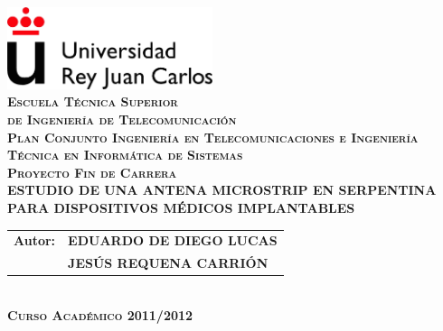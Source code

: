 \begin{titlepage}
    \begin{center}
        \includegraphics[width=6cm]{./Portada/urjc}\\
        \vspace{1.5cm}
        {\LARGE \textsc{ \textbf{ Escuela Técnica Superior }}}\\
        \vspace{0.3cm}
        {\LARGE \textsc{ \textbf{ de Ingeniería de Telecomunicación }}}\\
        \vspace{1.5cm}
        {\Large \textsc{ \textbf{ Plan Conjunto Ingeniería en Telecomunicaciones e Ingeniería Técnica en Informática de Sistemas}}}\\
        \vspace{3.5cm}
        {\huge \textsc{ \textbf{ Proyecto Fin de Carrera }}}\\
        \vspace{3cm}
        {\Large \textbf{ ESTUDIO DE UNA ANTENA MICROSTRIP EN SERPENTINA PARA DISPOSITIVOS MÉDICOS IMPLANTABLES }}\\
        \vspace{0.25cm}
        \vfill
        \begin{tabular}{rl}
        {\normalsize \textbf{Autor:}}
            & {\normalsize \textbf{EDUARDO DE DIEGO LUCAS}}\\
            {\normalsize \textbf{Tutor:} & {\normalsize \textbf{JESÚS REQUENA CARRIÓN}}}\\
        \end{tabular}\\
        \vspace{1cm}
        {\large \textsc{ \textbf{ Curso Académico 2011/2012 }}}
    \end{center}
\end{titlepage}
